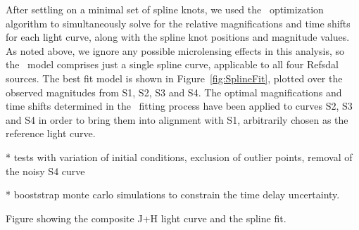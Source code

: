 After settling on a minimal set of spline knots, we used the \pycs\ optimization algorithm to simultaneously solve for the relative magnifications and time shifts for each light curve, along with the spline knot positions and magnitude values.   As noted above, we ignore any possible microlensing effects in this analysis, so the \pycs\ model comprises just a single spline curve, applicable to all four Refsdal sources. The best fit model is shown in Figure~\ref{fig:SplineFit}, plotted over the observed magnitudes from S1, S2, S3 and S4.  The optimal magnifications and time shifts determined in the \pycs\ fitting process have been applied to curves S2, S3 and S4 in order to bring them into alignment with S1, arbitrarily chosen as the reference light curve.


 * tests with variation of initial conditions, exclusion of outlier points, removal of the noisy S4 curve

 * booststrap monte carlo simulations to constrain the time delay uncertainty.
 
Figure showing the composite J+H light curve and the spline fit. 



